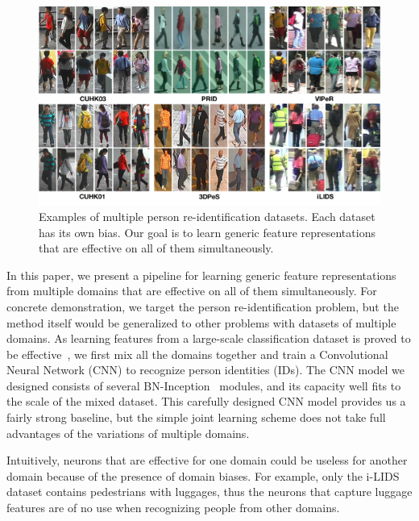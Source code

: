 \begin{figure}[t]
\begin{center}
\includegraphics[width=1.0\linewidth]{figures/multi_domain/reid_datasets.pdf}
\end{center}
\caption{Examples of multiple person re-identification datasets. Each dataset has its own bias. Our goal is to learn generic feature representations that are effective on all of them simultaneously.}
\label{fig:reid_datasets}
\end{figure}

In this paper, we present a pipeline for learning generic feature representations from multiple domains that are effective on all of them simultaneously. For concrete demonstration, we target the person re-identification problem, but the method itself would be generalized to other problems with datasets of multiple domains. As learning features from a large-scale classification dataset is proved to be effective~\cite{sun2014deep}, we first mix all the domains together and train a Convolutional Neural Network (CNN) to recognize person identities (IDs). The CNN model we designed consists of several BN-Inception~\cite{szegedy2014going,ioffe2015batch} modules, and its capacity well fits to the scale of the mixed dataset. This carefully designed CNN model provides us a fairly strong baseline, but the simple joint learning scheme does not take full advantages of the variations of multiple domains.

Intuitively, neurons that are effective for one domain could be useless for another domain because of the presence of domain biases. For example, only the i-LIDS dataset contains pedestrians with luggages, thus the neurons that capture luggage features are of no use when recognizing people from other domains.

